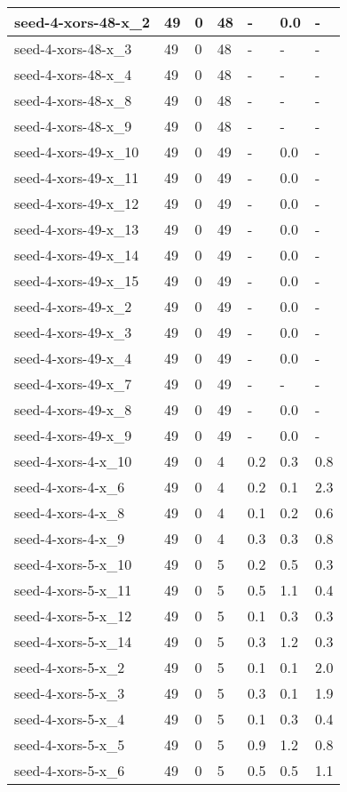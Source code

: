 \begin{scriptsize}
\begin{longtable}{|p{5cm}|l|l|l|l|l|l|}
seed-4-xors-48-x\_2&49&0&48&-&0.0&- \\ \hline 
seed-4-xors-48-x\_3&49&0&48&-&-&- \\ \hline 
seed-4-xors-48-x\_4&49&0&48&-&-&- \\ \hline 
seed-4-xors-48-x\_8&49&0&48&-&-&- \\ \hline 
seed-4-xors-48-x\_9&49&0&48&-&-&- \\ \hline 
seed-4-xors-49-x\_10&49&0&49&-&0.0&- \\ \hline 
seed-4-xors-49-x\_11&49&0&49&-&0.0&- \\ \hline 
seed-4-xors-49-x\_12&49&0&49&-&0.0&- \\ \hline 
seed-4-xors-49-x\_13&49&0&49&-&0.0&- \\ \hline 
seed-4-xors-49-x\_14&49&0&49&-&0.0&- \\ \hline 
seed-4-xors-49-x\_15&49&0&49&-&0.0&- \\ \hline 
seed-4-xors-49-x\_2&49&0&49&-&0.0&- \\ \hline 
seed-4-xors-49-x\_3&49&0&49&-&0.0&- \\ \hline 
seed-4-xors-49-x\_4&49&0&49&-&0.0&- \\ \hline 
seed-4-xors-49-x\_7&49&0&49&-&-&- \\ \hline 
seed-4-xors-49-x\_8&49&0&49&-&0.0&- \\ \hline 
seed-4-xors-49-x\_9&49&0&49&-&0.0&- \\ \hline 
seed-4-xors-4-x\_10&49&0&4&0.2&0.3&0.8 \\ \hline 
seed-4-xors-4-x\_6&49&0&4&0.2&0.1&2.3 \\ \hline 
seed-4-xors-4-x\_8&49&0&4&0.1&0.2&0.6 \\ \hline 
seed-4-xors-4-x\_9&49&0&4&0.3&0.3&0.8 \\ \hline 
seed-4-xors-5-x\_10&49&0&5&0.2&0.5&0.3 \\ \hline 
seed-4-xors-5-x\_11&49&0&5&0.5&1.1&0.4 \\ \hline 
seed-4-xors-5-x\_12&49&0&5&0.1&0.3&0.3 \\ \hline 
seed-4-xors-5-x\_14&49&0&5&0.3&1.2&0.3 \\ \hline 
seed-4-xors-5-x\_2&49&0&5&0.1&0.1&2.0 \\ \hline 
seed-4-xors-5-x\_3&49&0&5&0.3&0.1&1.9 \\ \hline 
seed-4-xors-5-x\_4&49&0&5&0.1&0.3&0.4 \\ \hline 
seed-4-xors-5-x\_5&49&0&5&0.9&1.2&0.8 \\ \hline 
seed-4-xors-5-x\_6&49&0&5&0.5&0.5&1.1 \\ \hline 

\end{longtable}
\end{scriptsize}
